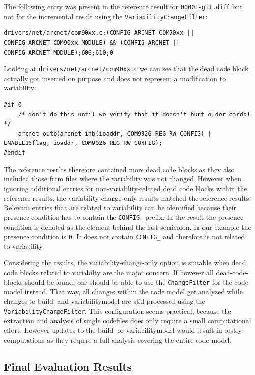 \documentclass[a4paper]{article}
\begin{document}
The following entry was present in the reference result for \texttt{00001-git.diff} but not for the incremental result using the \texttt{VariabilityChangeFilter}:

\begin{lstlisting}
drivers/net/arcnet/com90xx.c;(CONFIG_ARCNET_COM90xx || CONFIG_ARCNET_COM90xx_MODULE) && (CONFIG_ARCNET || CONFIG_ARCNET_MODULE);606;610;0
\end{lstlisting}

Looking at \texttt{drivers/net/arcnet/com90xx.c} we can see that the dead code block actually got inserted on purpose and does not represent a modification to variability:

\begin{lstlisting}
#if 0
    /* don't do this until we verify that it doesn't hurt older cards! */
    arcnet_outb(arcnet_inb(ioaddr, COM9026_REG_RW_CONFIG) | ENABLE16flag, ioaddr, COM9026_REG_RW_CONFIG);
#endif
\end{lstlisting}

The reference results therefore contained more dead code blocks as they also included those from files where the variability was not changed. However when ignoring additional entries for non-variablity-related dead code blocks within the reference results, the variability-change-only results matched the reference results. Relevant entries that are related to variability can be identified because their presence condition has to contain the \texttt{CONFIG\_} prefix. In the result the presence condition is denoted as the element behind the last semicolon. In our example the presence condition is \texttt{0}. It does not contain \texttt{CONFIG\_} and therefore is not related to variability.

Considering the results, the variability-change-only option is suitable when dead code blocks related to variabilty are the major concern. If however all dead-code-blocks should be found, one should be able to use the \texttt{ChangeFilter} for the code model instead. That way, all changes within the code model get analyzed while changes to build- and variabilitymodel are still processed using the \texttt{VariabilityChangeFilter}. This configuration seems practical, because the extraction and analysis of single codefiles does only require a small computational effort. However updates to the build- or variabilitymodel would result in costly computations as they require a full analysis covering the entire code model.

\subsection{Final Evaluation Results}
\end{document}
